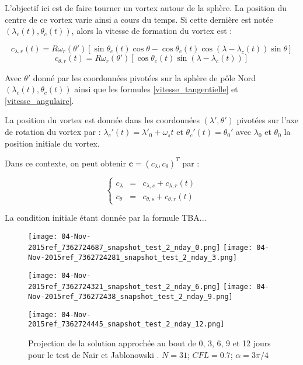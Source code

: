 L'objectif ici est de faire tourner un vortex autour de la sphère. La position du centre de ce vortex varie ainsi a cours du temps. Si cette dernière est notée $( \lambda_c (t), \theta_c (t))$, alors la vitesse de formation du vortex est :

\begin{equation}
c_{\lambda, r}(t) = R \omega_r ( \theta' ) \left[ \sin \theta_c (t) \cos \theta - \cos \theta_c (t) \cos ( \lambda - \lambda_c (t) ) \sin \theta \right]
\label{vitesse_lambda_vortex}
\end{equation}
\begin{equation}
c_{\theta, r}(t) = R \omega_r ( \theta' ) \left[ \cos \theta_c (t) \sin ( \lambda - \lambda_c (t) ) \right]
\label{vitesse_theta_vortex}
\end{equation}

Avec $\theta'$ donné par les coordonnées pivotées sur la sphère de p\^ole Nord $ ( \lambda_c (t), \theta_c (t) )$ ainsi que les formules \eqref{vitesse_tangentielle} et \eqref{vitesse_angulaire}.

La position du vortex est donnée dans les coordonnées $( \lambda', \theta')$ pivotées sur l'axe de rotation du vortex par : $\lambda_c ' (t) = \lambda' _0 + \omega_s t $ et $\theta_c ' (t) = \theta_0 '$ avec $\lambda_0$ et $\theta_0$ la position initiale du vortex.

Dans ce contexte, on peut obtenir $\mathbf{c} = ( c_{\lambda}, c_{\theta} )^T $ par :

\begin{equation}
  \left\{
  \begin{array}{rcl}
    c_{\lambda} & = & c_{\lambda,s} + c_{\lambda,r} (t) \\
    c_{\theta} & = & c_{\theta,s} + c_{\theta,r} (t)
  \end{array}
  \right.
\end{equation}

La condition initiale étant donnée par la formule TBA...


















\begin{figure}[H]
\texttt{[image: 04-Nov-2015ref\_7362724687\_snapshot\_test\_2\_nday\_0.png]}
\texttt{[image: 04-Nov-2015ref\_7362724281\_snapshot\_test\_2\_nday\_3.png]}

\texttt{[image: 04-Nov-2015ref\_7362724321\_snapshot\_test\_2\_nday\_6.png]}
\texttt{[image: 04-Nov-2015ref\_736272438\_snapshot\_test\_2\_nday\_9.png]}

\texttt{[image: 04-Nov-2015ref\_7362724445\_snapshot\_test\_2\_nday\_12.png]}
\caption{Projection de la solution approchée au bout de 0, 3, 6, 9 et 12 jours pour le test de Nair et Jablonowski \cite{Nair2008}. $N=31$; $CFL = 0.7$; $\alpha = 3 \pi / 4$}
\label{SNAPSHOT}
\end{figure}



